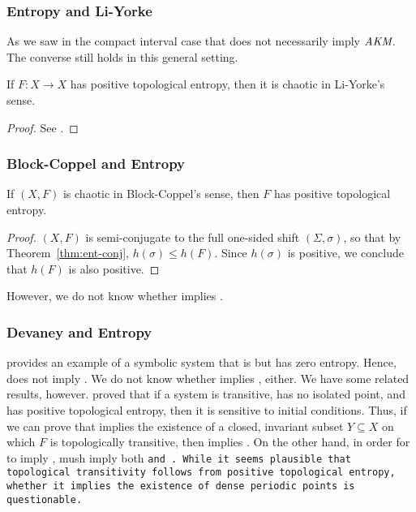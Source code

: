 \documentclass[10pt,twoside,draft]{book}
\begin{document}
\subsubsection*{Entropy and Li-Yorke}
As we saw in the compact interval case that \liy does not necessarily imply $\emph{AKM}$.
The converse still holds in this general setting.
\begin{theorem}
  If $F: X \to X$ has positive topological entropy, then it is chaotic in Li-Yorke's sense.
  \label{thm:ent-liy}
  \begin{proof}
    See \citet{blanchard}.
  \end{proof}
\end{theorem}

\subsubsection*{Block-Coppel and Entropy}
\begin{theorem}
  If $(X,F)$ is chaotic in Block-Coppel's sense, then $F$ has positive topological entropy.
  \begin{proof}
    $(X,F)$ is semi-conjugate to the full one-sided shift $(\Sigma, \sigma)$, so that by Theorem~\ref{thm:ent-conj}, $h(\sigma) \leq h(F)$.
    Since $h(\sigma)$ is positive, we conclude that $h(F)$ is also positive.
  \end{proof}
  \label{thm:blcp-ent}
\end{theorem}
%
However, we do not know whether \akm implies \blcp.

\subsubsection*{Devaney and Entropy}
\citet{glasner} provides an example of a symbolic system that is \dev but has zero entropy.
Hence, \dev does not imply \akm.
We do not know whether \akm implies \dev, either.
We have some related results, however.
\citet{glasner} proved that if a system is transitive, has no isolated point, and has positive topological entropy, then it is sensitive to initial conditions.
Thus, if we can prove that \akm implies the existence of a closed, invariant subset $Y \subseteq X$ on which $F$ is topologically transitive, then \akm implies \wig.
On the other hand, in order for \akm to imply \dev, \akm mush imply both \tt and \dpp.
While it seems plausible that topological transitivity follows from positive topological entropy, whether it implies the existence of dense periodic points is questionable.
\end{document}
